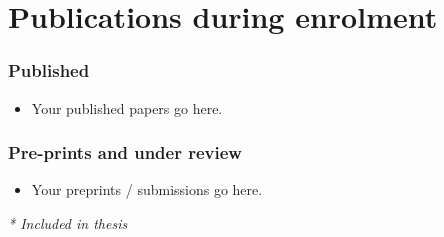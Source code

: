 %
\chapter*{Publications during enrolment}

\newcommand{\doilink}[1]{%
  \href{https://doi.org/#1}{\color{blue}\nolinkurl{https://doi.org/#1}}}

\subsection*{Published}

\begingroup\small
\begin{itemize}[label={},leftmargin=0pt,itemsep=0.8em]

    \item Your published papers go here.
\end{itemize}
\endgroup

\subsection*{Pre-prints and under review}

\begingroup\small
\begin{itemize}[label={},leftmargin=0pt,itemsep=0.8em]

    \item Your preprints / submissions go here.
\end{itemize}
\endgroup

\noindent\textit{* Included in thesis}

\cleardoublepage
